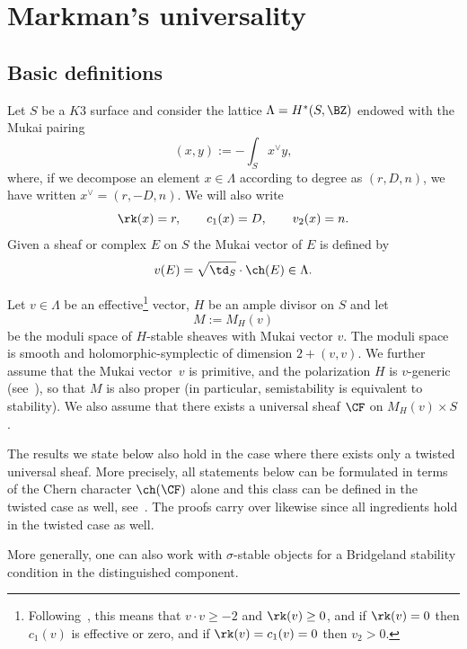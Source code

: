 \section{Markman's universality} \label{sec:Markman universality}
\subsection{Basic definitions} %
Let $S$ be a $K3$ surface and consider the lattice $\Lambda = H^{\ast}(S,\BZ)$ endowed with the Mukai pairing
\[
(x , y) := - \int_S x^{\vee} y,
\]
where, if we decompose an element $x \in \Lambda$ according to degree as $(r,D,n)$, we have written $x^{\vee} = (r,-D,n)$.
We will also write
\[
\rk(x) = r, \qquad c_1(x) = D, \qquad v_2(x) = n.
\]
Given a sheaf or complex $E$ on $S$ the Mukai vector of $E$ is defined by
\[
v(E) = \sqrt{\td_S} \cdot \ch(E) \in \Lambda.
\]

Let $v \in \Lambda$ be an effective\footnote{Following~\cite[Definition 1.1]{Markman},
this means that $v \cdot v \geq -2$ and $\rk(v) \geq 0$, and if $\rk(v)=0$ then $c_1(v)$ is effective or zero, and if $\rk(v)=c_1(v)=0$ then $v_2>0$.} vector, $H$ be an ample divisor on $S$
and let
\[
M := M_H(v)
\]
be the moduli space of $H$-stable sheaves with Mukai vector $v$.
The moduli space is smooth and holomorphic-symplectic of dimension $2+(v,v)$.
We further assume that the Mukai vector~$v$ is primitive, and the polarization $H$ is $v$-generic (see~\cite[Theorem~6.2.5]{HL}),
so that $M$ is also proper (in particular, semistability is equivalent to stability).
We also assume that there exists a universal sheaf $\CF$ on $M_H(v) \times S$.

\begin{rmk} \label{rmk:twisted universal sheaf}
The results we state below also hold in the case where there exists only a twisted universal sheaf.
More precisely, all statements below can be formulated
in terms of the Chern character $\ch(\CF)$ alone and this class can be defined in the twisted case as well, see~\cite[Section~3]{MarkmanGenerators}.
The proofs carry over likewise since all ingredients hold in the twisted case as well. %
\end{rmk}
\begin{rmk}
More generally, one can also work with $\sigma$-stable objects for a Bridgeland stability condition in the distinguished component.
\end{rmk}

